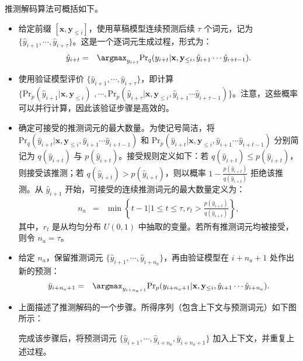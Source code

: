推测解码算法可概括如下。

\begin{itemize}
\item \vspace{0.5em} 给定前缀 $[\mathbf{x},\mathbf{y}_{\le i}]$，使用草稿模型连续预测后续 $\tau$ 个词元，记为 $\{\hat{y}_{i+1},\cdots,\hat{y}_{i+\tau}\}$。这是一个逐词元生成过程，形式为：
    \begin{eqnarray}
    \hat{y}_{i+t} & = & \argmax_{y_{i+t}} \mathrm{Pr}_q(y_{i+t}|\mathbf{x},\mathbf{y}_{\le i},\hat{y}_{i+1}\cdots\hat{y}_{i+t-1}).
    \end{eqnarray}
\item \vspace{0.3em} 使用验证模型评价 $\{\hat{y}_{i+1},\cdots,\hat{y}_{i+\tau}\}$，即计算\\ $\{\mathrm{Pr}_p(\hat{y}_{i+1}|\mathbf{x},\mathbf{y}_{\le i})$ $,\cdots,\mathrm{Pr}_p(\hat{y}_{i+\tau}|\mathbf{x},\mathbf{y}_{\le i},\hat{y}_{i+1}\cdots\hat{y}_{i+\tau-1})\}$。注意，这些概率可以并行计算，因此该验证步骤是高效的。
\item \vspace{0.3em} 确定可接受的推测词元的最大数量。为使记号简洁，将 $\mathrm{Pr}_q(\hat{y}_{i+t}|\mathbf{x},\mathbf{y}_{\le i},\hat{y}_{i+1}\cdots\hat{y}_{i+t-1})$ 和 $\mathrm{Pr}_p(\hat{y}_{i+t}|\mathbf{x},\mathbf{y}_{\le i},\hat{y}_{i+1}\cdots\hat{y}_{i+t-1})$ 分别简记为 $q(\hat{y}_{i+t})$ 与 $p(\hat{y}_{i+t})$。接受规则定义如下：若 $q(\hat{y}_{i+t}) \le p(\hat{y}_{i+t})$，则接受该推测；若 $q(\hat{y}_{i+t}) > p(\hat{y}_{i+t})$，则以概率 $1-\frac{p(\hat{y}_{i+t})}{q(\hat{y}_{i+t})}$ 拒绝该推测。从 $\hat{y}_{i+1}$ 开始，可接受的连续推测词元的最大数量定义为：
    \begin{eqnarray}
    n_a & = & \min \left\{t-1 | 1 \le t \le \tau, r_t > \frac{p(\hat{y}_{i+t})}{q(\hat{y}_{i+t})} \right\},
    \end{eqnarray}
    \noindent 其中，$r_t$ 是从均匀分布 $U(0,1)$ 中抽取的变量。若所有推测词元均被接受，则令 $n_a=\tau$。
\item 给定 $n_a$，保留推测词元 $\{\hat{y}_{i+1},\cdots,\hat{y}_{i+n_a}\}$，再由验证模型在 $i+n_a+1$ 处作出新的预测：
    \begin{eqnarray}
    \bar{y}_{i+n_a+1} & = & \argmax_{y_{i+n_a+1}} \mathrm{Pr}_p(y_{i+n_a+1}|\mathbf{x},\mathbf{y}_{\le i},\hat{y}_{i+1}\cdots\hat{y}_{i+n_a}).
    \end{eqnarray}
\item 上面描述了推测解码的一个步骤。所得序列（包含上下文与预测词元）如下图所示：
\begin{center}

\end{center}
    完成该步骤后，将预测词元 $\{\hat{y}_{i+1},\cdots,\hat{y}_{i+n_a},\bar{y}_{i+n_a+1} \}$ 加入上下文，并重复上述过程。
\end{itemize}
\vspace{0.5em}

